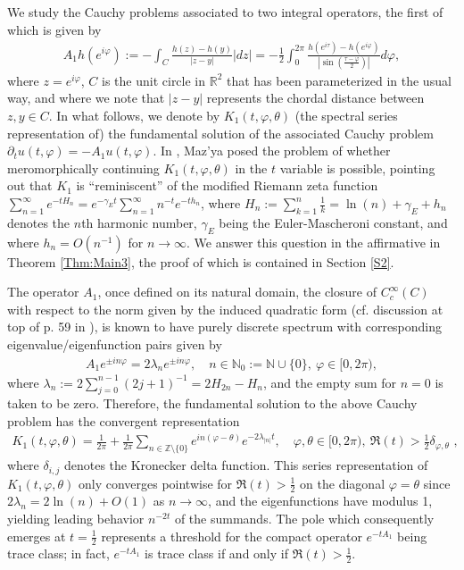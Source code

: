 \documentclass[letterpaper,10pt]{amsart}
\newcommand{\Z}{\mathbb Z}
\newcommand{\R}{\mathbb R}
\numberwithin{equation}{section}
\begin{document}
We study the Cauchy problems associated to two integral operators, the first of which is given by
\begin{align}
    A_1h(e^{i\varphi}) := -\int_{C}\frac{h(z)-h(y)}{|z-y|}|dz| = -\frac{1}{2}\int_0^{2\pi}\frac{h(e^{i\tau})-h(e^{i\varphi})}{|\sin(\tfrac{\tau-\varphi}{2})|}d\varphi,
\end{align}
where $z=e^{i\varphi}$, $C$ is the unit circle in $\R^2$ that has been parameterized in the usual way, and where we note that $|z-y|$ represents the chordal distance between $z,y \in C$. In what follows, we denote by $K_1(t,\varphi,\theta)$ (the spectral series representation of) the fundamental solution of the associated Cauchy problem $\partial_t u(t,\varphi) = -A_1u(t,\varphi)$. In \cite[Sect. 10.1]{Maz18}, Maz'ya posed the problem of whether meromorphically continuing $K_1(t,\varphi,\theta)$ in the $t$ variable is possible, pointing out that $K_1$ is ``reminiscent'' of the modified Riemann zeta function $\sum_{n=1}^\infty e^{-tH_n} = e^{-\gamma_Et}\sum_{n=1}^\infty n^{-t}e^{-th_n}$, where $H_n:=\sum_{k=1}^n \frac{1}{k} = \ln(n) + \gamma_E +h_n$ denotes the $n$th harmonic number, $\gamma_E$ being the Euler-Mascheroni constant, and where $h_n = O(n^{-1})$ for $n\to \infty$. We answer this question in the affirmative in Theorem \ref{Thm:Main3}, the proof of which is contained in Section \ref{S2}.

The operator $A_1$, once defined on its natural domain, the closure of $C_c^\infty(C)$ with respect to the norm given by the induced quadratic form (cf. discussion at top of p. 59 in \cite{MNP00}), is known to have purely discrete spectrum with corresponding eigenvalue/eigenfunction pairs given by
\begin{align}
    A_1 e^{\pm i n\varphi} = 2\lambda_ne^{\pm i n\varphi},\quad n\in\mathbb{N}_0:=\mathbb{N}\cup \{0\},\ \varphi\in[0,2\pi),
\end{align}
where $\lambda_n:=2\sum_{j=0}^{n-1}(2j+1)^{-1} = 2H_{2n}-H_n$, and the empty sum for $n = 0$ is taken to be zero. Therefore, the fundamental solution to the above Cauchy problem has the convergent representation
\begin{align}\label{Eq:SpecSer}
    K_1(t,\varphi,\theta) = \frac{1}{2\pi} + \frac{1}{2\pi}\sum_{n \in \Z \setminus \{0\}} e^{in(\varphi-\theta)}e^{-2\lambda_{|n|}t},\quad \varphi,\theta\in[0,2\pi),\ \Re(t)>\frac{1}{2}\delta_{\varphi,\theta}\,\,,
\end{align}
where $\delta_{i,j}$ denotes the Kronecker delta function. This series representation of $K_1(t,\varphi,\theta)$ only converges pointwise for $\Re(t)>\frac{1}{2}$ on the diagonal $\varphi=\theta$ since $2\lambda_{n} = 2\ln(n) + O(1)$ as $n \rightarrow \infty$, and the eigenfunctions have modulus 1, yielding leading behavior $n^{-2t}$ of the summands. The pole which consequently emerges at $t=\frac{1}{2}$ represents a threshold for the compact operator $e^{-tA_1}$ being trace class; in fact, $e^{-tA_1}$ is trace class if and only if $\Re(t)>\frac{1}{2}$. 
\end{document}
